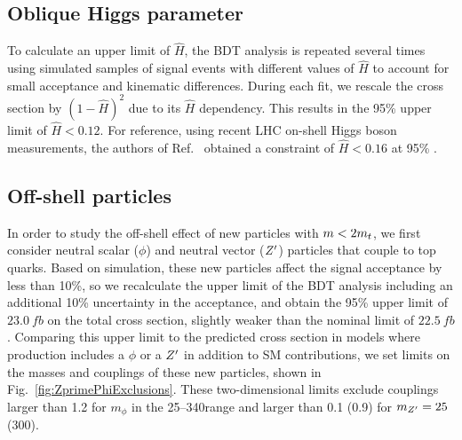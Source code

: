 \FloatBarrier

\subsection{Oblique Higgs parameter}

To calculate an upper limit of $\hat{H}$, the BDT analysis is repeated
several times using simulated samples of \tttt signal events with different
values of $\hat{H}$ to account for small acceptance and kinematic
differences. During each fit, we rescale the \ttH cross section by
$(1-\hat{H})^2$ due to its $\hat{H}$ dependency. This results in the 95\% \CL
upper limit of $\hat{H} < 0.12$. For reference, using recent LHC on-shell
Higgs boson measurements, the authors of Ref.~\cite{THEORY:ObliqueHiggs2019}
obtained a constraint of $\hat{H} < 0.16$ at 95\% \CL.


\subsection{Off-shell particles}

In order to study the off-shell effect of new particles with $m < 2m_t$,
we first consider neutral scalar ($\phi$) and neutral vector ($Z^\prime$)
particles that couple to top quarks. Based on simulation, these new particles
affect the signal acceptance by less than 10\%, so we recalculate the
\xsectttt upper limit of the BDT analysis including an additional 10\%
uncertainty in the acceptance, and obtain the 95\% \CL upper limit of
$23.0~\unit{fb}$ on the total \tttt cross section, slightly weaker than the
nominal limit of $22.5~\unit{fb}$. Comparing this upper limit to the predicted
cross section in models where \tttt production includes a $\phi$ or a
$Z^\prime$ in addition to SM contributions, we set limits on the masses and
couplings of these new particles, shown in
Fig.~\ref{fig:ZprimePhiExclusions}. These two-dimensional limits 
exclude couplings larger
than 1.2 for $m_{\phi}$ in the 25--340\GeV range and larger than 0.1 (0.9)
for $m_{Z^\prime} = 25$ (300)\GeV.

